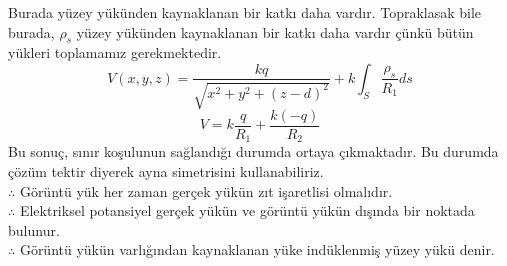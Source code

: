 \begin{theorem}
\begin{center}
\end{center}

Burada yüzey yükünden kaynaklanan bir katkı daha vardır. Topraklasak bile burada, $\rho_{s}$ yüzey yükünden kaynaklanan bir katkı daha vardır çünkü bütün yükleri toplamamız gerekmektedir.
\[ V(x,y,z) = \dfrac{k q}{\sqrt{x^{2} + y^{2} + (z-d)^{2}}}  + k \int_{S} \dfrac{\rho_{s}}{R_{1}} ds \]
\[ V = k \dfrac{q}{R_{1}} + \dfrac{k(-q)}{R_{2}} \]
Bu sonuç, sınır koşulunun sağlandığı durumda ortaya çıkmaktadır. Bu durumda çözüm tektir diyerek ayna simetrisini kullanabiliriz.\\
$\therefore$ Görüntü yük her zaman gerçek yükün zıt işaretlisi olmalıdır.\\
$\therefore$ Elektriksel potansiyel gerçek yükün ve görüntü yükün dışında bir noktada bulunur.\\
$\therefore$ Görüntü yükün varlığından kaynaklanan yüke indüklenmiş yüzey yükü denir.

\


\end{theorem}
